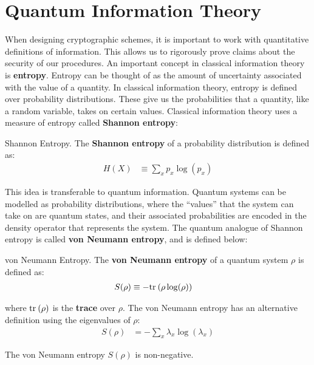 \section{Quantum Information Theory}
\label{section:qit}

When designing cryptographic schemes, it is important to work with quantitative definitions of information. This allows us to rigorously prove claims about the security of our procedures. An important concept in classical information theory is \textbf{entropy}. Entropy can be thought of as the amount of uncertainty associated with the value of a quantity. In classical information theory, entropy is defined over probability distributions. These give us the probabilities that a quantity, like a random variable, takes on certain values. Classical information theory uses a measure of entropy called \textbf{Shannon entropy}:

\begin{definition}{Shannon Entropy.}
    The \textbf{Shannon entropy} of a probability distribution is defined as:
    \begin{align}
    H(X) &\equiv \sum_x p_x \log (p_x)
\end{align}
\end{definition}

This idea is transferable to quantum information. Quantum systems can be modelled as probability distributions, where the ``values'' that the system can take on are quantum states, and their associated probabilities are encoded in the density operator that represents the system. The quantum analogue of Shannon entropy is called \textbf{von Neumann entropy}, and is defined below:

\begin{definition}{von Neumann Entropy.}
    The \textbf{von Neumann entropy} of a quantum system $\rho$ is defined as:
    \begin{align}
        S(\rho) &\equiv -\text{tr}_{}\left( {\rho \log(\rho)} \right)
    \end{align}
    
    where $\text{tr}_{}\left( {\rho} \right)$ is the \textbf{trace} over $\rho$. The von Neumann entropy has an alternative definition using the eigenvalues of $\rho$:
    \begin{align}
        S(\rho) &= -\sum_x \lambda_x \log(\lambda_x)
    \end{align}
\end{definition}

\begin{remark}
    The von Neumann entropy $S(\rho)$ is non-negative.
\end{remark}


